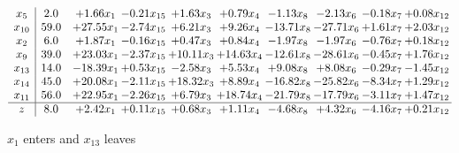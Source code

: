 \documentclass[9pt]{article}
\begin{document}
 \[\begin{array}{c| c c@{\hskip 2pt} c@{\hskip 2pt} c@{\hskip 2pt} c@{\hskip 2pt} c@{\hskip 2pt} c@{\hskip 2pt} c@{\hskip 2pt} c@{\hskip 2pt} }
 x_{5}   &  2.0 & +  1.66 x_{1} & -0.21 x_{15} & +  1.63 x_{3} & +  0.79 x_{4} & -1.13 x_{8} & -2.13 x_{6} & -0.18 x_{7} & +  0.08 x_{12}\\
 x_{10}   &  59.0 & + 27.55 x_{1} & -2.74 x_{15} & +  6.21 x_{3} & +  9.26 x_{4} & -13.71 x_{8} & -27.71 x_{6} & +  1.61 x_{7} & +  2.03 x_{12}\\
 x_{2}   &  6.0 & +  1.87 x_{1} & -0.16 x_{15} & +  0.47 x_{3} & +  0.84 x_{4} & -1.97 x_{8} & -1.97 x_{6} & -0.76 x_{7} & +  0.18 x_{12}\\
 x_{9}   &  39.0 & + 23.03 x_{1} & -2.37 x_{15} & + 10.11 x_{3} & + 14.63 x_{4} & -12.61 x_{8} & -28.61 x_{6} & -0.45 x_{7} & +  1.76 x_{12}\\
 x_{13}   &  14.0 & -18.39 x_{1} & +  0.53 x_{15} & -2.58 x_{3} & +  5.53 x_{4} & +  9.08 x_{8} & +  8.08 x_{6} & -0.29 x_{7} & -1.45 x_{12}\\
 x_{14}   &  45.0 & + 20.08 x_{1} & -2.11 x_{15} & + 18.32 x_{3} & +  8.89 x_{4} & -16.82 x_{8} & -25.82 x_{6} & -8.34 x_{7} & +  1.29 x_{12}\\
 x_{11}   &  56.0 & + 22.95 x_{1} & -2.26 x_{15} & +  6.79 x_{3} & + 18.74 x_{4} & -21.79 x_{8} & -17.79 x_{6} & -3.11 x_{7} & +  1.47 x_{12}\\
\hline
z    &  8.0 & +  2.42 x_{1} & +  0.11 x_{15} & +  0.68 x_{3} & +  1.11 x_{4} & -4.68 x_{8} & +  4.32 x_{6} & -4.16 x_{7} & +  0.21 x_{12}\\
\end{array}\]


 $ x_{1} $ enters and $ x_{13} $ leaves 
\end{document}
